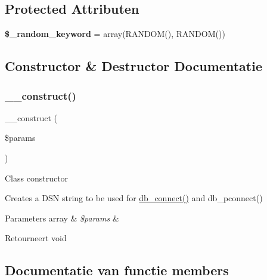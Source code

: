 \subsection*{Protected Attributen}
\begin{DoxyCompactItemize}
\item 
\mbox{\label{class_c_i___d_b__postgre__driver_a10213aa6e05f6d924d3277bb1d2fea00}} 
{\bfseries \$\+\_\+random\+\_\+keyword} = array(\textquotesingle{}R\+A\+N\+D\+OM()\textquotesingle{}, \textquotesingle{}R\+A\+N\+D\+OM()\textquotesingle{})
\end{DoxyCompactItemize}


\subsection{Constructor \& Destructor Documentatie}
\mbox{\label{class_c_i___d_b__postgre__driver_a9162320adff1a1a4afd7f2372f753a3e}} 
\subsubsection{\texorpdfstring{\_\_construct()}{\_\_construct()}}
{\footnotesize\ttfamily \+\_\+\+\_\+construct (\begin{DoxyParamCaption}\item[{}]{\$params }\end{DoxyParamCaption})}

Class constructor

Creates a D\+SN string to be used for \mbox{\hyperlink{class_c_i___d_b__postgre__driver_a52bf595e79e96cc0a7c907a9b45aeb4d}{db\+\_\+connect()}} and db\+\_\+pconnect()


\begin{DoxyParams}[1]{Parameters}
array & {\em \$params} & \\
\hline
\end{DoxyParams}
\begin{DoxyReturn}{Retourneert}
void 
\end{DoxyReturn}


\subsection{Documentatie van functie members}
\mbox{\label{class_c_i___d_b__postgre__driver_a4d9082658000e5ede8312067c6dda9db}} 
